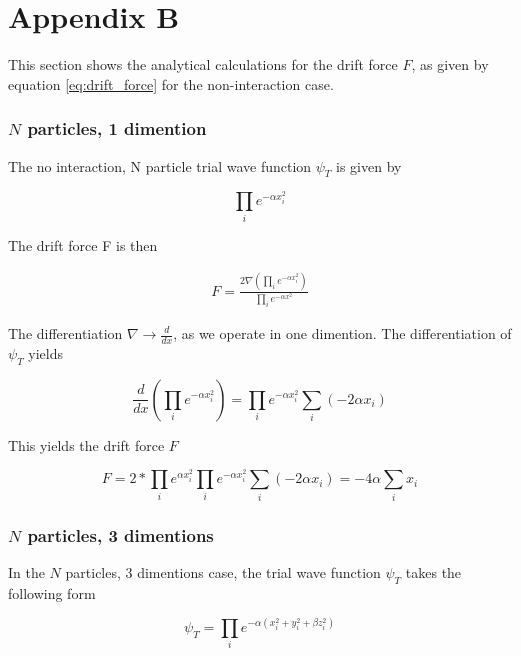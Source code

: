 \documentclass[norsk,a4paper,12pt]{article}
\begin{document}
\section*{Appendix B} \label{sec:appendix_b}

This section shows the analytical calculations for the drift force $F$, as given by equation \ref{eq:drift_force} for the non-interaction case.

\subsubsection{$N$ particles, 1 dimention}

The no interaction, N particle trial wave function $\psi_T$ is given by

\begin{equation}
	\prod_i e^{-\alpha x_i^2}
\end{equation}

 The drift force F is then

\begin{align}
	F = \frac{2 \nabla ( \prod_i e^{-\alpha x_i^2} )}{ \prod_i e^{-\alpha x^2} }
\end{align}

The differentiation $\nabla \rightarrow \frac{d }{d x}$, as we operate in one dimention. The differentiation of $\psi_T$ yields

\begin{equation}
	\label{eq:differentiation_WF}
	\frac{d}{d x} ( \prod_i e^{-\alpha x_i^2}) =  \prod_i e^{-\alpha x_i^2} \sum_i (-2\alpha x_i)
\end{equation}

This yields the drift force $F$

\begin{equation}
	F =  2* \prod_i e^{\alpha x_i^2}   \prod_i e^{-\alpha x_i^2} \sum_i (-2\alpha x_i) = - 4 \alpha \sum_i x_i
\end{equation}

\subsubsection{$N$ particles, 3 dimentions}

In the $N$ particles, $3$ dimentions case, the trial wave function $\psi_T$ takes the following form

\begin{equation}
	\psi_T = \prod_i e^{- \alpha (x_i^2 + y_i^2 + \beta z_i^2)} 
\end{equation}
\end{document}

